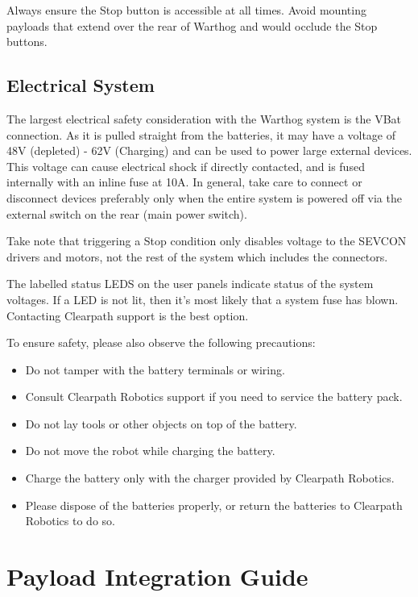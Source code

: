 \documentclass[]{clearpath-latex/clearpath-manual}
\begin{document}
Always ensure the Stop button is accessible at all times. Avoid mounting payloads that extend over the rear of Warthog and would occlude the Stop buttons.

\subsection{Electrical System}

The largest electrical safety consideration with the Warthog system is the VBat connection. As it is pulled straight from the batteries, it may have a voltage of 48V (depleted) - 62V (Charging) and can be used to power large external devices. This voltage can cause electrical shock if directly contacted, and is fused internally with an inline fuse at 10A. In general, take care to connect or disconnect devices preferably only when the entire system is powered off via the external switch on the rear (main power switch).

Take note that triggering a Stop condition only disables voltage to the SEVCON drivers and motors, not the rest of the system which includes the connectors.

The labelled status LEDS on the user panels indicate status of the system voltages. If a LED is not lit, then it's most likely that a system fuse has blown. Contacting Clearpath support is the best option.

To ensure safety, please also observe the following precautions:

\begin{itemize}[nolistsep]
  \item Do not tamper with the battery terminals or wiring.
  \item Consult Clearpath Robotics support if you need to service the battery pack.
  \item Do not lay tools or other objects on top of the battery.
  \item Do not move the robot while charging the battery.
  \item Charge the battery only with the charger provided by Clearpath Robotics.
  \item Please dispose of the batteries properly, or return the batteries to Clearpath Robotics to do so.
\end{itemize}


\section{Payload Integration Guide}
\end{document}
